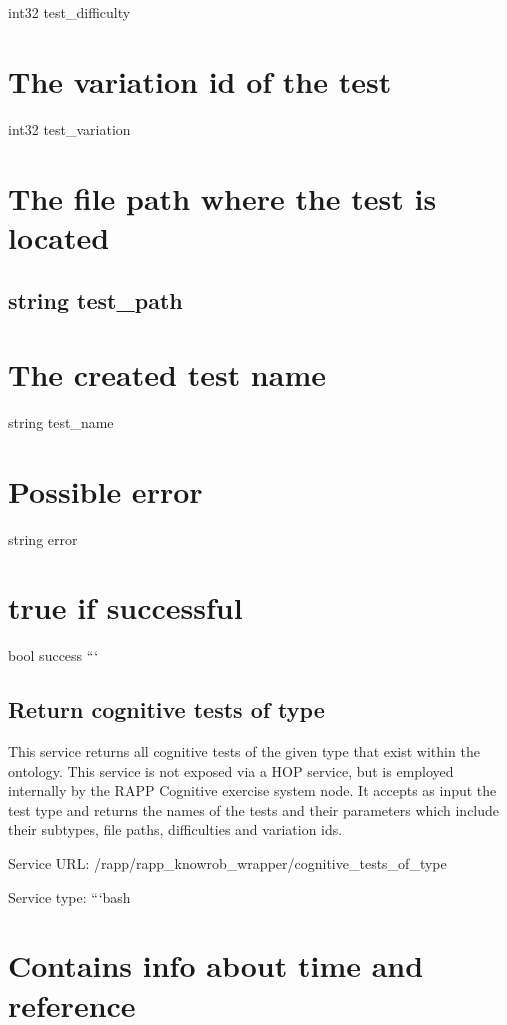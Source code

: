int32 test\-\_\-difficulty \section*{The variation id of the test}

int32 test\-\_\-variation \section*{The file path where the test is located}

\subsection*{string test\-\_\-path }

\section*{The created test name}

string test\-\_\-name \section*{Possible error}

string error \section*{true if successful}

bool success ```

\subsection*{Return cognitive tests of type}

This service returns all cognitive tests of the given type that exist within the ontology. This service is not exposed via a H\-O\-P service, but is employed internally by the R\-A\-P\-P Cognitive exercise system node. It accepts as input the test type and returns the names of the tests and their parameters which include their subtypes, file paths, difficulties and variation ids.

Service U\-R\-L\-: {\ttfamily /rapp/rapp\-\_\-knowrob\-\_\-wrapper/cognitive\-\_\-tests\-\_\-of\-\_\-type}

Service type\-: ```bash \section*{Contains info about time and reference}

